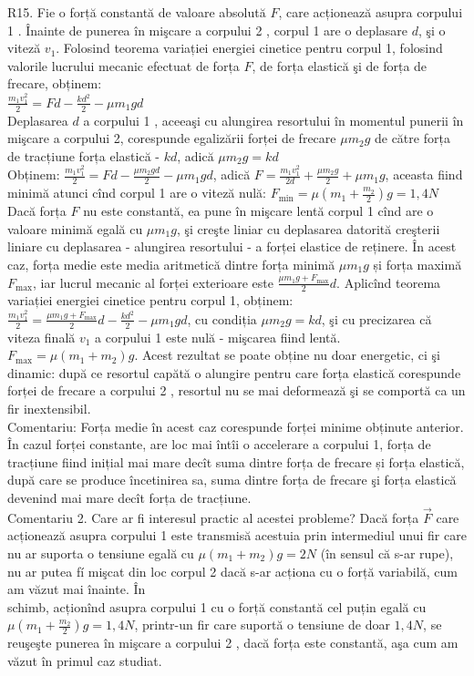 R15. Fie o forță constantă de valoare absolută $F$, care acționează asupra corpului 1 . Înainte de punerea în mişcare a corpului 2 , corpul 1 are o deplasare $d$, şi o viteză $v_{1}$. Folosind teorema variației energiei cinetice pentru corpul 1, folosind valorile lucrului mecanic efectuat de forța $F$, de forța elastică şi de forța de frecare, obținem:\\
$\frac{m_{1} v_{1}^{2}}{2}=F d-\frac{k d^{2}}{2}-\mu m_{1} g d$\\
Deplasarea $d$ a corpului 1 , aceeaşi cu alungirea resortului în momentul punerii în mişcare a corpului 2, corespunde egalizării forței de frecare $\mu m_{2} g$ de către forța de tracțiune forța elastică - $k d$, adică $\mu m_{2} g=k d$\\
Obținem: $\frac{m_{1} v_{1}^{2}}{2}=F d-\frac{\mu m_{2} g d}{2}-\mu m_{1} g d$, adică $F=\frac{m_{1} v_{1}^{2}}{2 d}+\frac{\mu m_{2} g}{2}+\mu m_{1} g$, aceasta fiind minimă atunci cînd corpul 1 are o viteză nulă: $F_{\min }=\mu\left(m_{1}+\frac{m_{2}}{2}\right) g=1,4 N$\\
Dacă forța $F$ nu este constantă, ea pune în mişcare lentă corpul 1 cînd are o valoare minimă egală cu $\mu m_{1} g$, şi creşte liniar cu deplasarea datorită creşterii liniare cu deplasarea - alungirea resortului - a forței elastice de reținere. În acest caz, forța medie este media aritmetică dintre forța minimă $\mu m_{1} g$ și forța maximă $F_{\max }$, iar lucrul mecanic al forței exterioare este $\frac{\mu m_{1} g+F_{\max }}{2} d$. Aplicînd teorema variației energiei cinetice pentru corpul 1, obținem: $\frac{m_{1} v_{1}^{2}}{2}=\frac{\mu m_{1} g+F_{\max }}{2} d-\frac{k d^{2}}{2}-\mu m_{1} g d$, cu condiția $\mu m_{2} g=k d$, şi cu precizarea că viteza finală $v_{1}$ a corpului 1 este nulă - mişcarea fiind lentă. $F_{\max }=\mu\left(m_{1}+m_{2}\right) g$. Acest rezultat se poate obține nu doar energetic, ci şi dinamic: după ce resortul capătă o alungire pentru care forța elastică corespunde forței de frecare a corpului 2 , resortul nu se mai deformează şi se comportă ca un fir inextensibil.\\
Comentariu: Forța medie în acest caz corespunde forței minime obținute anterior. În cazul forței constante, are loc mai întîi o accelerare a corpului 1, forța de tracțiune fiind inițial mai mare decît suma dintre forța de frecare și forța elastică, după care se produce încetinirea sa, suma dintre forța de frecare şi forța elastică devenind mai mare decît forța de tracțiune.\\
Comentariu 2. Care ar fi interesul practic al acestei probleme? Dacă forța $\vec{F}$ care acționează asupra corpului 1 este transmisă acestuia prin intermediul unui fir care nu ar suporta o tensiune egală cu $\mu\left(m_{1}+m_{2}\right) g=2 N$ (în sensul că s-ar rupe), nu ar putea fí mişcat din loc corpul 2 dacă s-ar acționa cu o forță variabilă, cum am văzut mai înainte. În\\
schimb, acționînd asupra corpului 1 cu o forță constantă cel puțin egală cu $\mu\left(m_{1}+\frac{m_{2}}{2}\right) g=1,4 N$, printr-un fir care suportă o tensiune de doar $1,4 N$, se reuşeşte punerea în mişcare a corpului 2 , dacă forța este constantă, aşa cum am văzut în primul caz studiat.

